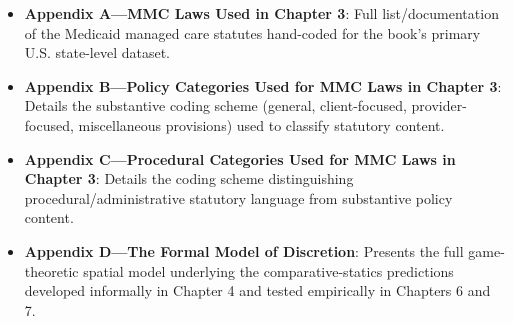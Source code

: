 \documentclass[12pt]{article}
\begin{document}
\begin{itemize}[leftmargin=*, itemsep=4pt]
    \item \textbf{Appendix A---MMC Laws Used in Chapter 3}: Full list/documentation of the Medicaid managed care statutes hand-coded for the book's primary U.S. state-level dataset.
    \item \textbf{Appendix B---Policy Categories Used for MMC Laws in Chapter 3}: Details the substantive coding scheme (general, client-focused, provider-focused, miscellaneous provisions) used to classify statutory content.
    \item \textbf{Appendix C---Procedural Categories Used for MMC Laws in Chapter 3}: Details the coding scheme distinguishing procedural/administrative statutory language from substantive policy content.
    \item \textbf{Appendix D---The Formal Model of Discretion}: Presents the full game-theoretic spatial model underlying the comparative-statics predictions developed informally in Chapter 4 and tested empirically in Chapters 6 and 7.
\end{itemize}
\end{document}
